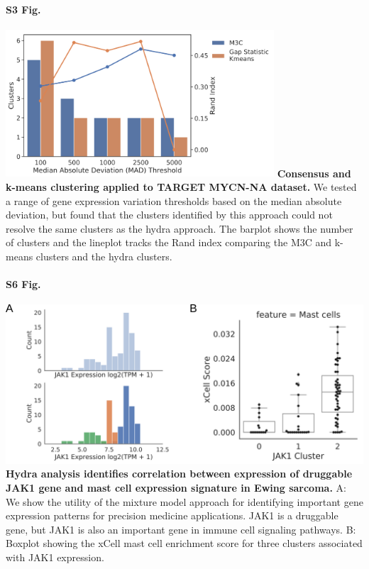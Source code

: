\documentclass[10pt,letterpaper]{article}
\begin{document}
\paragraph*{S3 Fig.}
\includegraphics[width=0.75\textwidth]{img/PNG/clustering-screen}
\label{S3_Fig}
{\bf{Consensus and k-means clustering applied to TARGET MYCN-NA dataset.}} We tested a range of gene expression variation thresholds based on the median absolute deviation, but found that the clusters identified by this approach could not resolve the same clusters as the hydra approach. The barplot shows the number of clusters and the lineplot tracks the Rand index comparing the M3C and k-means clusters and the hydra clusters.





\paragraph*{S6 Fig.}
\includegraphics[width=\textwidth]{img/PNG/ewing-jak1-expression-fig}
\label{S6_Fig} {\bf Hydra analysis identifies correlation between expression of druggable JAK1 gene and mast cell expression signature in Ewing sarcoma.} A: We show the utility of the mixture model approach for identifying important gene expression patterns for precision medicine applications. JAK1 is a druggable gene, but JAK1 is also an important gene in immune cell signaling pathways. B: Boxplot showing the xCell mast cell enrichment score for three clusters associated with JAK1 expression.
\end{document}
